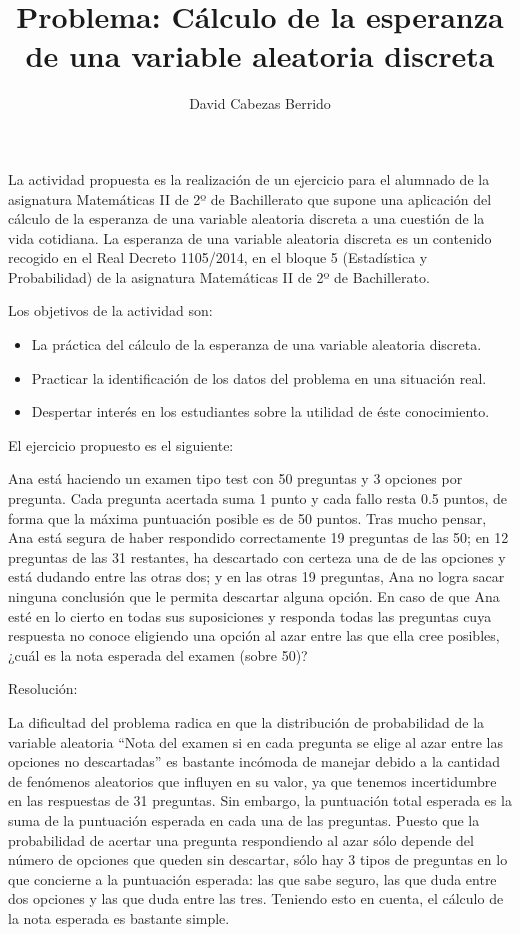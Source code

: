 \documentclass[12pt]{article}
\title{Problema: Cálculo de la esperanza de una variable aleatoria discreta}
\author{David Cabezas Berrido}
\date{}
\begin{document}
\maketitle

La actividad propuesta es la realización de un ejercicio para el alumnado de la asignatura Matemáticas II de 2º de Bachillerato que supone una aplicación del cálculo de la esperanza de una variable aleatoria discreta a una cuestión de la vida cotidiana. La esperanza de una variable aleatoria discreta es un contenido recogido en el Real Decreto 1105/2014, en el bloque 5 (Estadística y Probabilidad) de la asignatura Matemáticas II de 2º de Bachillerato.

Los objetivos de la actividad son:
\begin{itemize}
	\item La práctica del cálculo de la esperanza de una variable aleatoria discreta.
	\item Practicar la identificación de los datos del problema en una situación real.
	\item Despertar interés en los estudiantes sobre la utilidad de éste conocimiento.
\end{itemize}

El ejercicio propuesto es el siguiente:

Ana está haciendo un examen tipo test con 50 preguntas y 3 opciones por pregunta. Cada pregunta acertada suma 1 punto y cada fallo resta 0.5 puntos, de forma que la máxima puntuación posible es de 50 puntos. Tras mucho pensar, Ana está segura de haber respondido correctamente 19 preguntas de las 50; en 12 preguntas de las 31 restantes, ha descartado con certeza una de de las opciones y está dudando entre las otras dos; y en las otras 19 preguntas, Ana no logra sacar ninguna conclusión que le permita descartar alguna opción. En caso de que Ana esté en lo cierto en todas sus suposiciones y responda todas las preguntas cuya respuesta no conoce eligiendo una opción al azar entre las que ella cree posibles, ¿cuál es la nota esperada del examen (sobre 50)?

Resolución:

La dificultad del problema radica en que la distribución de probabilidad de la variable aleatoria ``Nota del examen si en cada pregunta se elige al azar entre las opciones no descartadas'' es bastante incómoda de manejar debido a la cantidad de fenómenos aleatorios que influyen en su valor, ya que tenemos incertidumbre en las respuestas de 31 preguntas. Sin embargo, la puntuación total esperada es la suma de la puntuación esperada en cada una de las preguntas. Puesto que la probabilidad de acertar una pregunta respondiendo al azar sólo depende del número de opciones que queden sin descartar, sólo hay 3 tipos de preguntas en lo que concierne a la puntuación esperada: las que sabe seguro, las que duda entre dos opciones y las que duda entre las tres. Teniendo esto en cuenta, el cálculo de la nota esperada es bastante simple.
\end{document}
